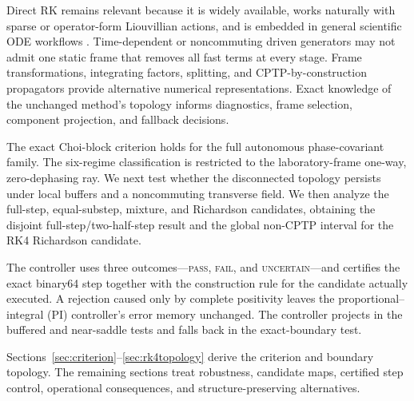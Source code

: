 Direct RK remains relevant because it is widely available, works naturally with sparse or operator-form Liouvillian actions, and is embedded in general scientific ODE workflows \cite{PuzzuoliEtAl2023}. Time-dependent or noncommuting driven generators may not admit one static frame that removes all fast terms at every stage. Frame transformations, integrating factors, splitting, and CPTP-by-construction propagators provide alternative numerical representations. Exact knowledge of the unchanged method's topology informs diagnostics, frame selection, component projection, and fallback decisions.

The exact Choi-block criterion holds for the full autonomous phase-covariant family. The six-regime classification is restricted to the laboratory-frame one-way, zero-dephasing ray. We next test whether the disconnected topology persists under local buffers and a noncommuting transverse field. We then analyze the full-step, equal-substep, mixture, and Richardson candidates, obtaining the disjoint full-step/two-half-step result and the global non-CPTP interval for the RK4 Richardson candidate.

The controller uses three outcomes---\textsc{pass}, \textsc{fail}, and \textsc{uncertain}---and certifies the exact binary64 step together with the construction rule for the candidate actually executed. A rejection caused only by complete positivity leaves the proportional--integral (PI) controller's error memory unchanged. The controller projects in the buffered and near-saddle tests and falls back in the exact-boundary test.

Sections~\ref{sec:criterion}--\ref{sec:rk4topology} derive the criterion and boundary topology. The remaining sections treat robustness, candidate maps, certified step control, operational consequences, and structure-preserving alternatives.
